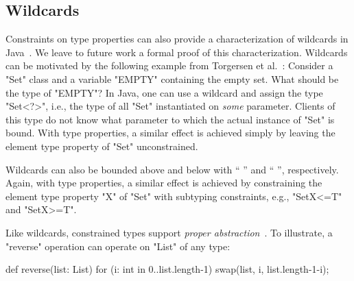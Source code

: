 \subsection{Wildcards}
\label{sec:wildcards}

Constraints on type properties can also provide a characterization of
wildcards in Java~\cite{Java3,adding-wildcards,wildcards-safe}.
We leave to future work a formal proof of this
characterization.
Wildcards can be  motivated
by the following example from Torgersen et al.~\cite{adding-wildcards}:
Consider a \xcd"Set" class and a variable \xcd"EMPTY" containing
the empty set.  What should be the type of \xcd"EMPTY"?
In Java, one can use a wildcard and 
assign the type \xcd"Set<?>", i.e., the type of all \xcd"Set"
instantiated on \emph{some} parameter.  Clients of this
type do not know what parameter to which the actual instance of \xcd"Set"
is bound.
With type properties,
a similar effect is achieved simply by leaving the
element type property of \xcd"Set" unconstrained.

Wildcards can
also be bounded above and below with
``  '' and ``  '',
respectively.
%
Again, with type properties, 
a similar effect is achieved by constraining
the
element type property \xcd"X" of \xcd"Set" with subtyping constraints,
e.g., \xcd"Set{X<=T}" and \xcd"Set{X>=T}".


Like wildcards,
constrained types support
\emph{proper abstraction}~\cite{adding-wildcards}.  To illustrate, a
\xcd"reverse"
operation can operate on \xcd"List" of any type:
{
\begin{xten}
def reverse(list: List) {
  for (i: int in 0..list.length-1)
    swap(list, i, list.length-1-i);
}
\end{xten}}

